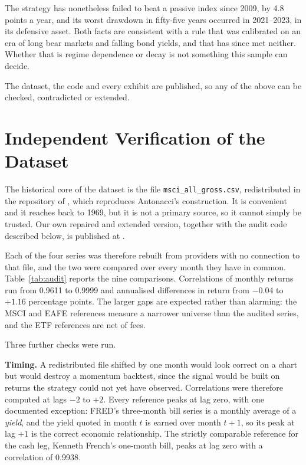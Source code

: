 \documentclass[11pt,a4paper]{article}
\let\oldsection\section
\renewcommand{\section}{\FloatBarrier\oldsection}
\begin{document}
The strategy has nonetheless failed to beat a passive index since 2009, by 4.8
points a year, and its worst drawdown in fifty-five years occurred in
2021--2023, in its defensive asset. Both facts are consistent with a rule that
was calibrated on an era of long bear markets and falling bond yields, and that
has since met neither. Whether that is regime dependence or decay is not
something this sample can decide.

The dataset, the code and every exhibit are published, so any of the above can
be checked, contradicted or extended.



\appendix
\section{Independent Verification of the Dataset}
\label{app:audit}

The historical core of the dataset is the file \texttt{msci\_all\_gross.csv},
redistributed in the repository of \citet{jansengem}, which reproduces
Antonacci's construction. It is convenient and it reaches back to 1969, but it
is not a primary source, so it cannot simply be trusted. Our own repaired and
extended version, together with the audit code described below, is published at
\citet{petit2026data}.

\begin{table}[!ht]
  \centering
  \caption{The dataset against independent sources.}
  \label{tab:audit}
  
\end{table}

Each of the four series was therefore rebuilt from providers with no connection
to that file, and the two were compared over every month they have in common.
Table~\ref{tab:audit} reports the nine comparisons. Correlations of monthly
returns run from 0.9611 to 0.9999 and annualised differences in return from
$-0.04$ to $+1.16$ percentage points. The larger gaps are expected rather than
alarming: the MSCI and EAFE references measure a narrower universe than the
audited series, and the ETF references are net of fees.

Three further checks were run.

\textbf{Timing.} A redistributed file shifted by one month would look correct
on a chart but would destroy a momentum backtest, since the signal would be
built on returns the strategy could not yet have observed. Correlations were
therefore computed at lags $-2$ to $+2$. Every reference peaks at lag zero,
with one documented exception: FRED's three-month bill series is a monthly
average of a \emph{yield}, and the yield quoted in month $t$ is earned over
month $t+1$, so its peak at lag $+1$ is the correct economic relationship. The
strictly comparable reference for the cash leg, Kenneth French's one-month
bill, peaks at lag zero with a correlation of 0.9938.
\end{document}
